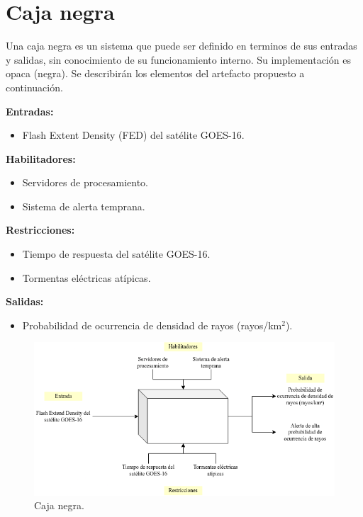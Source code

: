 \section{Caja negra}
Una caja negra es un sistema que puede ser definido en terminos de sus entradas 
y salidas, sin conocimiento de su funcionamiento interno. Su implementación es 
opaca (negra). Se describirán los elementos del artefacto propuesto a 
continuación.

\textbf{Entradas:}
\begin{itemize}
  \item Flash Extent Density (FED) del satélite GOES-16.
\end{itemize}

\textbf{Habilitadores:}
\begin{itemize}
  \item Servidores de procesamiento.
  \item Sistema de alerta temprana.
\end{itemize}

\textbf{Restricciones:}
\begin{itemize}
  \item Tiempo de respuesta del satélite GOES-16.
  \item Tormentas eléctricas atípicas.
\end{itemize}


\textbf{Salidas:}
\begin{itemize}
  \item Probabilidad de ocurrencia de densidad de rayos (rayos/km$^2$).
\end{itemize}

\begin{figure}[H]
  \centering
  \includegraphics[width=14cm]{E_IMAGENES/4_Aporte/CajaNegra}
  \caption{
    Caja negra.
  }
  \label{fig:cajanegra}
\end{figure}